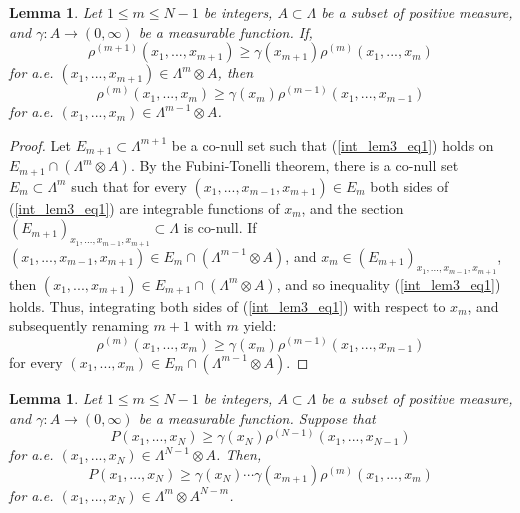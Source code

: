 \documentclass[12pt,leqno]{amsart}
\newtheorem{lem}[theor]{Lemma}{\bf}{\it}
\numberwithin{equation}{section}
\numberwithin{theor}{section}
\numberwithin{rem}{section}
\begin{document}
\begin{lem}
\label{Lem_int3}
Let $1\leq m\leq N-1$ be integers, $A\subset \Lambda$ be 
a subset of positive measure, and 
$\gamma: A\rightarrow (0,\infty)$ be a measurable  function.  If, 
\begin{equation}
\label{int_lem3_eq1}
\rho^{(m+1)}(x_1,...,x_{m+1})\geq \gamma(x_{m+1}) 
\rho^{(m)}(x_1,...,x_{m}) 
\end{equation}
for a.e.  
$(x_1,...,x_{m+1})\in \Lambda^m\otimes A$, then 
\begin{equation}
\label{int_lem3_eq2}
\rho^{(m)}(x_1,...,x_{m})\geq \gamma(x_{m}) 
\rho^{(m-1)}(x_1,...,x_{m-1}) 
\end{equation}
for a.e. 
$(x_1,...,x_{m})\in \Lambda^{m-1}\otimes A$.
\end{lem}
\begin{proof}
Let $E_{m+1}\subset\Lambda^{m+1}$ be a co-null set 
such that (\ref{int_lem3_eq1}) holds on 
$E_{m+1} \cap \left (\Lambda^m\otimes A\right )$.  By the 
Fubini-Tonelli theorem, there is a co-null set $E_m\subset 
\Lambda^m$ such that for every 
$(x_1,...,x_{m-1},x_{m+1})\in E_m$ both sides of 
(\ref{int_lem3_eq1}) are integrable functions of $x_m$, and 
the section $(E_{m+1})_{x_1,...,x_{m-1},x_{m+1}}\subset 
\Lambda$ is co-null.  If $(x_1,...,x_{m-1},x_{m+1})\in E_m\cap \left (
\Lambda^{m-1}\otimes A\right )$, and  $x_m\in 
(E_{m+1})_{x_1,...,x_{m-1},x_{m+1}}$, then
$(x_1,...,x_{m+1})\in E_{m+1}\cap \left (\Lambda^m\otimes A\right )$, and so inequality (\ref{int_lem3_eq1}) holds.  
Thus, integrating both sides of (\ref{int_lem3_eq1}) with respect to $x_m$, and  
subsequently renaming $m+1$ with $m$ yield:
\begin{equation}
\rho^{(m)}(x_1,...,x_{m})\geq \gamma(x_{m}) 
\rho^{(m-1)}(x_1,...,x_{m-1}) 
\end{equation}
for every 
$(x_1,...,x_{m})\in E_m\cap \left (\Lambda^{m-1}\otimes A\right )$.
\end{proof}

\begin{lem}
\label{Lem_int4}
Let $1\leq m\leq N-1$ be integers, $A\subset \Lambda$ be 
a subset of positive measure, and 
$\gamma: A\rightarrow (0,\infty)$ be a measurable  
function.  Suppose that 
\begin{equation}
\label{int_lem4_eq1}
P(x_1,...,x_{N})\geq \gamma(x_{N}) 
\rho^{(N-1)}(x_1,...,x_{N-1})
\end{equation}
for a.e.  
$(x_1,...,x_{N})\in \Lambda^{N-1}\otimes A$.  Then, 
\begin{equation}
\label{int_lem4_eq2}
P(x_1,...,x_{N})\geq \gamma(x_{N})\cdots\gamma(x_{m+1}) 
\rho^{(m)}(x_1,...,x_{m}) 
\end{equation}
for a.e. 
$(x_1,...,x_{N})\in \Lambda^{m}\otimes A^{N-m}$.  
\end{lem}
\end{document}
